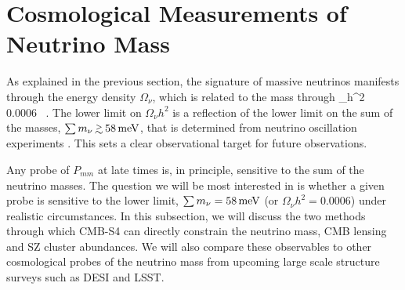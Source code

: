 \section{Cosmological Measurements of Neutrino Mass} \label{sec:mnuobs}


As explained in the previous section,  the signature of massive neutrinos manifests through
the energy density $\Omega_\nu$, which is related to the mass through
\beq
\Omega_\nu h^2 \simeq \,  \, \gtrsim  \, 0.0006  \ .
\eeq
The lower limit on $\Omega_\nu h^2$ is a reflection of the lower limit on the sum of the masses, $\sum m_\nu \, \gtrsim  \, 58 \, {\rm meV}$, that is determined from neutrino oscillation experiments \cite{Agashe:2014kda}.  This sets a clear observational target for future observations.

Any probe of $P_{mm}$ at late times is, in principle, sensitive to the sum of the neutrino masses.  The question we will be most interested in is whether a given probe is sensitive to the lower limit, $\sum m_\nu = 58 \, {\rm meV}$ (or $\Omega_\nu h^2 = 0.0006$) under realistic circumstances.  In this subsection, we will discuss the two methods through which CMB-S4 can directly constrain the neutrino mass, CMB lensing and SZ cluster abundances.  We will also compare these observables to other cosmological probes of the neutrino mass from upcoming large scale structure surveys such as DESI and LSST.



